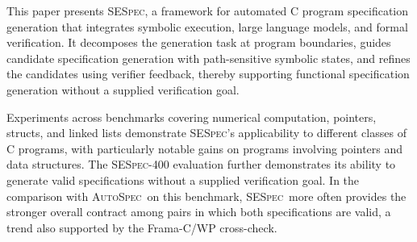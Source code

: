 \documentclass[lettersize,journal]{IEEEtran}
\newcommand{\toolname}{\textsc{SESpec}}
\newcommand{\autospec}{\textsc{AutoSpec}}
\begin{document}


{This paper presents \toolname, a framework for automated C program specification generation that integrates symbolic execution, large language models, and formal verification. It decomposes the generation task at program boundaries, guides candidate specification generation with path-sensitive symbolic states, and refines the candidates using verifier feedback, thereby supporting functional specification generation without a supplied verification goal.}

{Experiments across benchmarks covering numerical computation, pointers, structs, and linked lists demonstrate \toolname's applicability to different classes of C programs, with particularly notable gains on programs involving pointers and data structures. The \toolname-400 evaluation further demonstrates its ability to generate valid specifications without a supplied verification goal. In the comparison with \autospec\ on this benchmark, \toolname\ more often provides the stronger overall contract among pairs in which both specifications are valid, a trend also supported by the Frama-C/WP cross-check.}
\end{document}
